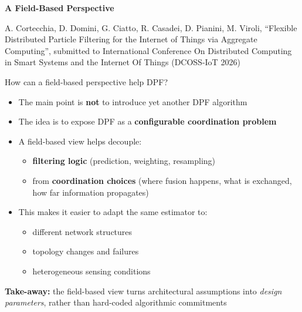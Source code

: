 \documentclass[aspectratio=169]{beamer}
\begin{document}
\begin{frame}[standout]
	\Huge\textbf{A Field-Based Perspective}

    \vspace{0.8cm}

    \scriptsize
    A. Cortecchia, D. Domini, G. Ciatto, R. Casadei, D. Pianini, M. Viroli, 
    ``Flexible Distributed Particle Filtering for the Internet of Things via Aggregate Computing'', 
    submitted to International Conference On Distributed Computing in Smart Systems and the Internet Of Things (DCOSS-IoT 2026) 

\end{frame}

\begin{frame}{How can a field-based perspective help DPF?}
\begin{itemize}
    \item The main point is \textbf{not} to introduce yet another DPF algorithm
    \item The idea is to expose DPF as a \textbf{configurable coordination problem}
    \item A field-based view helps decouple:
    \begin{itemize}
        \item \textbf{filtering logic} (prediction, weighting, resampling)
        \item from \textbf{coordination choices} (where fusion happens, what is exchanged, how far information propagates)
    \end{itemize}
    \item This makes it easier to adapt the same estimator to:
    \begin{itemize}
        \item different network structures
        \item topology changes and failures
        \item heterogeneous sensing conditions
    \end{itemize}
\end{itemize}

\vspace{0.5em}
\textbf{Take-away:} the field-based view turns architectural assumptions into \emph{design parameters}, rather than hard-coded algorithmic commitments
\end{frame}
\end{document}
